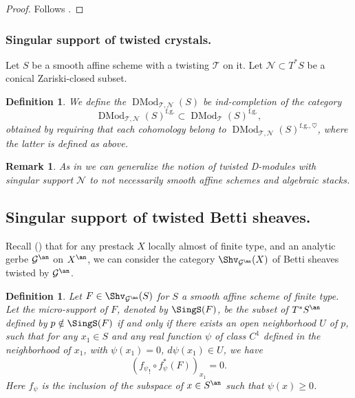 \documentclass[9pt]{amsart}
\newcommand{\cG}{{\mathcal G}}
\newcommand{\cN}{{\mathcal N}}
\newcommand{\cT}{{\mathcal T}}
\newtheorem{df}[subsubsection]{Definition}
\newtheorem{rem}[subsubsection]{Remark}
\numberwithin{equation}{section}
\DeclareMathOperator{\D}{{DMod}}
\begin{document}
	\begin{proof}
		Follows \cite[Theorem 2.2.1]{HTT}.
	\end{proof}
	
	\subsubsection{Singular support of twisted crystals.}
	
	Let $S$ be a smooth affine scheme with a twisting $\cT$ on it. Let $\cN \subset T^*S$ be a conical Zariski-closed subset. 
	
	\begin{df}
		We define the $\D_{\cT, \cN}(S)$ be ind-completion of the category $$\D_{\cT, \cN}(S)^{\text{f.g.}} \subset \D_{\cT}(S)^{\text{f.g.}},$$ obtained by requiring that each cohomology belong to $\D_{\cT, \cN}(S)^{\text{f.g.}, \heartsuit}$, where the latter is defined as above. 
	\end{df}
	
	\begin{rem}
		As in \cite[A.3.3-A.3.6]{GKRV} we can generalize the notion of twisted D-modules with singular support $\cN$ to not necessarily smooth affine schemes and algebraic stacks.
	\end{rem}
	
	\subsection{Singular support of twisted Betti sheaves.}
	
	Recall (\cite[13.2]{CF}) that for any prestack $X$ locally almost of finite type, and an analytic gerbe $\cG^{\an}$ on $X^{\an}$, we can consider the category $\Shv_{\cG^{\an}}(X)$ of Betti sheaves twisted by $\cG^{\an}$. 
	
	
	\begin{df}\cite[5.1.2]{KS}
		Let $F \in \Shv_{\cG^{\an}}(S)$ for $S$ a smooth affine scheme of finite type. Let the \emph{micro-support of $F$}, denoted by $\SingS(F)$, be the subset of $T^*S^{\an}$ defined by $p\notin \SingS(F)$ if and only if there exists an open neighborhood $U$ of $p$, such that for any $x_1\in S$ and any real function $\psi$ of class $C^1$ defined in the neighborhood of $x_1$, with $\psi(x_1) = 0$, $d\psi(x_1) \in U$, we have 
		$$({f_{\psi}}_! \circ f_{\psi}^*(F))_{x_1} = 0.$$
		Here $ f_{\psi}$ is the inclusion of the subspace of $x\in S^{\an}$ such that $\psi(x) \geq 0$.
	\end{df}
	
\end{document}
